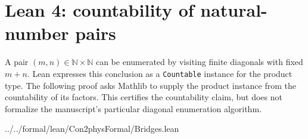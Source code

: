 \section{Lean 4: countability of natural-number pairs}
\label{sec:lean-bridge-08}
A pair $(m,n)\in\mathbb{N}\times\mathbb{N}$ can be enumerated
by visiting finite diagonals with fixed $m+n$.
Lean expresses this conclusion as a \texttt{Countable} instance
for the product type. The following proof asks Mathlib to supply
the product instance from the countability of its factors.
This certifies the countability claim, but does not formalize
the manuscript's particular diagonal enumeration algorithm.


{../../formal/lean/Con2physFormal/Bridges.lean}
